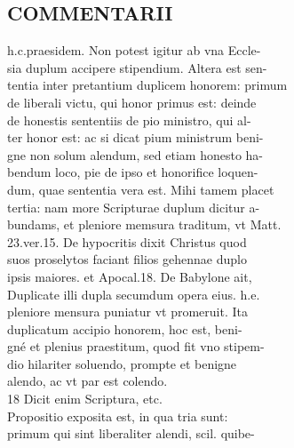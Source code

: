 \documentclass{article}
\begin{document}
\begin{pages}
\section*{COMMENTARII \\
                }h.c.praesidem. Non potest igitur ab vna Eccle- \\
                sia duplum accipere stipendium. Altera est sen- \\
                tentia inter pretantium duplicem honorem: primum \\
                de liberali victu, qui honor primus est: deinde \\
                de honestis sententiis de pio ministro, qui al- \\
                ter honor est: ac si dicat pium ministrum beni- \\
                gne non solum alendum, sed etiam honesto ha- \\
                bendum loco, pie de ipso et honorifice loquen- \\
                dum, quae sententia vera est. Mihi tamem placet \\
                tertia: nam more Scripturae duplum dicitur a- \\
                bundams, et pleniore memsura traditum, vt Matt. \\
                23.ver.15. De hypocritis dixit Christus quod \\
                suos proselytos faciant filios gehennae duplo \\
                ipsis maiores. et Apocal.18. De Babylone ait, \\
                Duplicate illi dupla secumdum opera eius. h.e. \\
                pleniore mensura puniatur vt promeruit. Ita \\
                duplicatum accipio honorem, hoc est, beni- \\
                gné et plenius praestitum, quod fit vno stipem- \\
                dio hilariter soluendo, prompte et benigne \\
                alendo, ac vt par est colendo. \\
                18 Dicit enim Scriptura, etc. \\
                Propositio exposita est, in qua tria sunt: \\
                primum qui sint liberaliter alendi, scil. quibe- \\

\end{pages}
\end{document}
